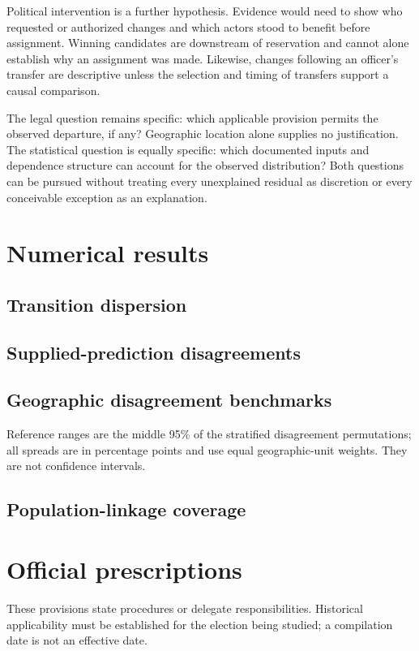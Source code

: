 \documentclass[11pt]{article}
\begin{document}
Political intervention is a further hypothesis. Evidence would need to show who requested or authorized changes and which actors stood to benefit before assignment. Winning candidates are downstream of reservation and cannot alone establish why an assignment was made. Likewise, changes following an officer's transfer are descriptive unless the selection and timing of transfers support a causal comparison.

The legal question remains specific: which applicable provision permits the observed departure, if any? Geographic location alone supplies no justification. The statistical question is equally specific: which documented inputs and dependence structure can account for the observed distribution? Both questions can be pursued without treating every unexplained residual as discretion or every conceivable exception as an explanation.

\clearpage


\clearpage\appendix
\section{Numerical results}
\subsection{Transition dispersion}

\subsection{Supplied-prediction disagreements}

\subsection{Geographic disagreement benchmarks}


Reference ranges are the middle 95\% of the stratified disagreement permutations; all spreads are in percentage points and use equal geographic-unit weights. They are not confidence intervals.
\subsection{Population-linkage coverage}

\clearpage
\section{Official prescriptions}
These provisions state procedures or delegate responsibilities. Historical applicability must be established for the election being studied; a compilation date is not an effective date.
\begingroup\footnotesize

\endgroup
\end{document}
